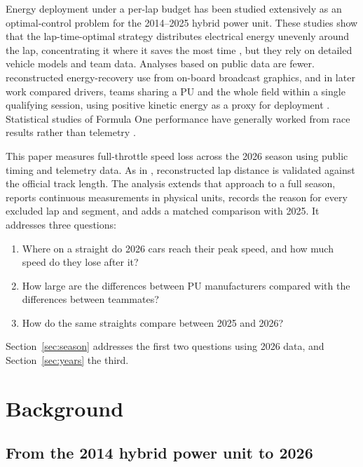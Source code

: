 \documentclass[11pt,a4paper]{article}
\begin{document}
Energy deployment under a per-lap budget has been studied extensively as an optimal-control problem for the 2014--2025 hybrid power unit. These studies show that the lap-time-optimal strategy distributes electrical energy unevenly around the lap, concentrating it where it saves the most time \citep{limebeer2014ers, salazar2017policy, ebbesen2018timeoptimal}, but they rely on detailed vehicle models and team data. Analyses based on public data are fewer. \citet{bopaiah2020strategy} reconstructed energy-recovery use from on-board broadcast graphics, and in later work compared drivers, teams sharing a PU and the whole field within a single qualifying session, using positive kinetic energy as a proxy for deployment \citep{bopaiah2021}. Statistical studies of Formula One performance have generally worked from race results rather than telemetry \citep{bell2016formula, vankesteren2023bayesian}.

This paper measures full-throttle speed loss across the 2026 season using public timing and telemetry data. As in \citet{bopaiah2021}, reconstructed lap distance is validated against the official track length. The analysis extends that approach to a full season, reports continuous measurements in physical units, records the reason for every excluded lap and segment, and adds a matched comparison with 2025. It addresses three questions:
\begin{enumerate}
  \item Where on a straight do 2026 cars reach their peak speed, and how much speed do they lose after it?
  \item How large are the differences between PU manufacturers compared with the differences between teammates?
  \item How do the same straights compare between 2025 and 2026?
\end{enumerate}
Section~\ref{sec:season} addresses the first two questions using 2026 data, and Section~\ref{sec:years} the third.

\section{Background}

\subsection{From the 2014 hybrid power unit to 2026}
\end{document}
